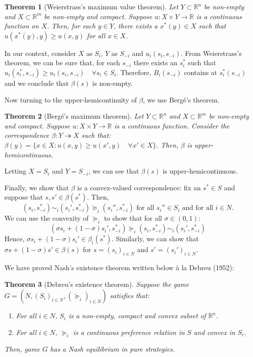 \documentclass[12pt]{report}
\newtheorem{theorem}{Theorem}[chapter]
\begin{document}
\begin{theorem}[Weierstrass's maximum value theorem]
Let $Y\subset\mathbb{R}^n$ be non-empty and $X\subset\mathbb{R}^m$ be non-empty and compact. Suppose $u:X\times Y\to\mathbb{R}$ is a continuous function on $X$. Then, for each $y\in Y$, there exists a $x^*(y)\in X$ such that $u(x^*(y), y)\geq u(x,y)$ for all $x\in X$.
\end{theorem}

In our context, consider $X$ as $S_i$, $Y$ as $S_{-i}$ and $u_i(s_i, s_{-i})$. From Weierstrass's theorem, we can be sure that, for each $s_{-i}$ there exists an $s_i^*$ such that $u_i(s_i^*, s_{-i})\geq u_i(s_i, s_{-i}) \quad \forall s_i\in S_i$. Therefore, $B_i(s_{-i})$ contains at $s_i^*(s_{-i})$ and we conclude that $\beta(s)$ is non-empty.

Now turning to the upper-hemicontinuity of $\beta$, we use Bergé's theorem.

\begin{theorem}[Bergé's maximum theorem]
Let $Y\subset\mathbb{R}^n$ and $X\subset\mathbb{R}^m$ be non-empty and compact. Suppose $u:X\times Y\to\mathbb{R}$ is a continuous function. Consider the correspondence $\beta : Y\twoheadrightarrow X$ such that:$\beta(y) = \{x\in X:u(x,y)\geq u(x',y)\quad \forall x'\in X\}$. Then, $\beta$ is upper-hemicontinuous.
\end{theorem}

Letting $X = S_i$ and $Y = S_{-i}$, we can see that $\beta(s)$ is upper-hemicontinuous.

Finally, we show that $\beta$ is a convex-valued correspondence: fix an $s^*\in S$ and suppose that $s, s'\in\beta(s^*)$. Then, $$(s_i, s_{-i}^*)\sim_i(s_i',s_{-i}^*)\succeq_i (s_i'',s_{-i}^*) \text{ for all } s_i''\in S_i\text{ and for all }i\in N\text{.}$$We can use the convexity of $\succeq_i$ to show that for all $\sigma\in (0,1)$:$$(\sigma s_i + (1-\sigma)s_i',s_{-i}^*)\succeq_i (s_i, s_{-i}^*)\sim_i(s_i',s_{-i}^*)$$ Hence, $\sigma s_i + (1-\sigma)s_i'\in\beta_i(s^*)$. Similarly, we can show that $\sigma s + (1 - \sigma)s'\in \beta(s)$ for $s = (s_i)_{i\in N}$ and $s' = (s_i')_{i\in N}$.

We have proved Nash's existence theorem written below à la Debreu (1952):

\begin{theorem}[Debreu's existence theorem]
Suppose the game $G = (N, (S_i)_{i\in N}, (\succeq_i)_{i\in N})$ satisfies that:\begin{enumerate}
\item For all $i\in N$, $S_i$ is a non-empty, compact and convex subset of $\mathbb{R}^n$.
\item For all $i\in N$, $\succeq_i$ is a continuous preference relation in $S$ and convex in $S_i$.
\end{enumerate} Then, game $G$ has a Nash equilibrium in pure strategies.
\end{theorem}
\end{document}
